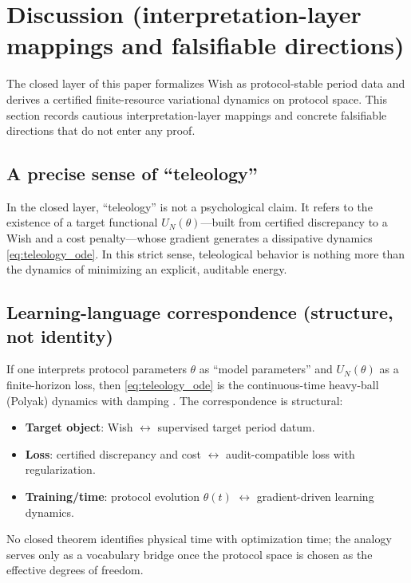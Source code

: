 
\section{Discussion (interpretation-layer mappings and falsifiable directions)}
\label{sec:discussion}

The closed layer of this paper formalizes Wish as protocol-stable period data and derives a certified finite-resource variational dynamics on protocol space.
This section records cautious interpretation-layer mappings and concrete falsifiable directions that do not enter any proof.

\subsection{A precise sense of ``teleology''}
\label{sec:discussion_teleology}

In the closed layer, ``teleology'' is not a psychological claim.
It refers to the existence of a target functional $U_N(\theta)$---built from certified discrepancy to a Wish and a cost penalty---whose gradient generates a dissipative dynamics \eqref{eq:teleology_ode}.
In this strict sense, teleological behavior is nothing more than the dynamics of minimizing an explicit, auditable energy.

\subsection{Learning-language correspondence (structure, not identity)}
\label{sec:discussion_learning}

If one interprets protocol parameters $\theta$ as ``model parameters'' and $U_N(\theta)$ as a finite-horizon loss, then \eqref{eq:teleology_ode} is the continuous-time heavy-ball (Polyak) dynamics with damping \cite{Polyak1964}.
The correspondence is structural:
\begin{itemize}
\item \textbf{Target object}: Wish $\leftrightarrow$ supervised target period datum.
\item \textbf{Loss}: certified discrepancy and cost $\leftrightarrow$ audit-compatible loss with regularization.
\item \textbf{Training/time}: protocol evolution $\theta(t)$ $\leftrightarrow$ gradient-driven learning dynamics.
\end{itemize}
No closed theorem identifies physical time with optimization time; the analogy serves only as a vocabulary bridge once the protocol space is chosen as the effective degrees of freedom.


